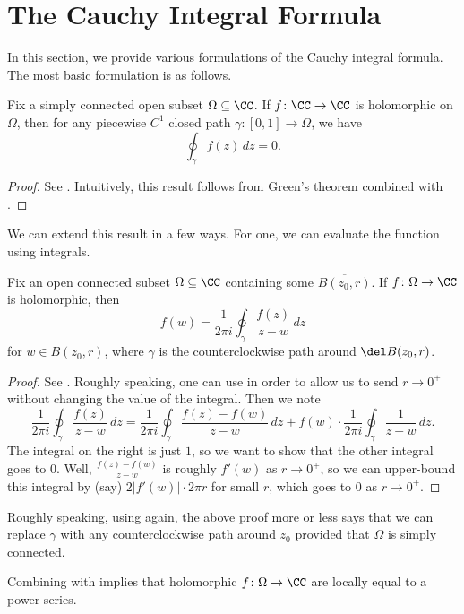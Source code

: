 \documentclass[notes.tex]{subfiles}
\begin{document}
\section{The Cauchy Integral Formula}
In this section, we provide various formulations of the Cauchy integral formula. The most basic formulation is as follows.
\begin{theorem} \label{thm:cauchy-goursat}
	Fix a simply connected open subset $\Omega\subseteq\CC$. If $f\colon\CC\to\CC$ is holomorphic on $\Omega$, then for any piecewise $C^1$ closed path $\gamma\colon[0,1]\to\Omega$, we have
	\[\oint_\gamma f(z)\,dz=0.\]
\end{theorem}
\begin{proof}
	See \cite[Theorem~4.65, Theorem~4.70]{nir-complex-analysis}. Intuitively, this result follows from Green's theorem combined with .
\end{proof}
We can extend this result in a few ways. For one, we can evaluate the function using integrals.
\begin{theorem} \label{thm:cif}
	Fix an open connected subset $\Omega\subseteq\CC$ containing some $\overline{B(z_0,r)}$. If $f\colon\Omega\to\CC$ is holomorphic, then
	\[f(w)=\frac1{2\pi i}\oint_\gamma\frac{f(z)}{z-w}\,dz\]
	for $w\in B(z_0,r)$, where $\gamma$ is the counterclockwise path around $\del B(z_0,r)$.
\end{theorem}
\begin{proof}
	See \cite[Theorem~4.63]{nir-complex-analysis}. Roughly speaking, one can use  in order to allow us to send $r\to0^+$ without changing the value of the integral. Then we note
	\[\frac1{2\pi i}\oint_\gamma\frac{f(z)}{z-w}\,dz=\frac1{2\pi i}\oint_\gamma\frac{f(z)-f(w)}{z-w}\,dz+f(w)\cdot\frac1{2\pi i}\oint_\gamma\frac1{z-w}\,dz.\]
	The integral on the right is just $1$, so we want to show that the other integral goes to $0$. Well, $\frac{f(z)-f(w)}{z-w}$ is roughly $f'(w)$ as $r\to0^+$, so we can upper-bound this integral by (say) $2|f'(w)|\cdot2\pi r$ for small $r$, which goes to $0$ as $r\to0^+$.
\end{proof}
\begin{remark}
	Roughly speaking, using  again, the above proof more or less says that we can replace $\gamma$ with any counterclockwise path around $z_0$ provided that $\Omega$ is simply connected.
\end{remark}
\begin{remark} \label{rem:holo-is-ana}
	Combining  with  implies that holomorphic $f\colon\Omega\to\CC$ are locally equal to a power series.
\end{remark}
\end{document}
